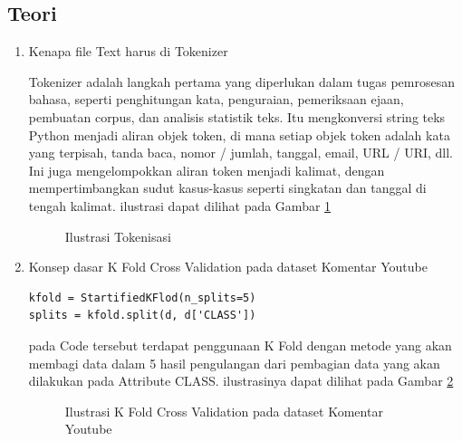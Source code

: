 \subsection{Teori}
\begin{enumerate}
\item Kenapa file Text harus di Tokenizer
\par Tokenizer adalah langkah pertama yang diperlukan dalam tugas pemrosesan bahasa, seperti penghitungan kata, penguraian, pemeriksaan ejaan, pembuatan corpus, dan analisis statistik teks. Itu mengkonversi string teks Python menjadi aliran objek token, di mana setiap objek token adalah kata yang terpisah, tanda baca, nomor / jumlah, tanggal, email, URL / URI, dll. Ini juga mengelompokkan aliran token menjadi kalimat, dengan mempertimbangkan sudut kasus-kasus seperti singkatan dan tanggal di tengah kalimat. ilustrasi dapat dilihat pada Gambar \ref{data1}

\begin{figure}[!htbp]
      \caption{Ilustrasi Tokenisasi}
      \label{data1}
\end{figure}

\item Konsep dasar K Fold Cross Validation pada dataset Komentar Youtube
\begin{verbatim}
kfold = StartifiedKFlod(n_splits=5)
splits = kfold.split(d, d['CLASS'])
\end{verbatim}
\par pada Code tersebut terdapat penggunaan K Fold dengan metode yang akan membagi data dalam 5 hasil pengulangan dari pembagian data yang akan dilakukan pada Attribute CLASS. ilustrasinya dapat dilihat pada Gambar \ref{data2}

\begin{figure}[!htbp]
      \caption{Ilustrasi  K Fold Cross Validation pada dataset Komentar Youtube}
      \label{data2}
\end{figure}


\end{enumerate}
